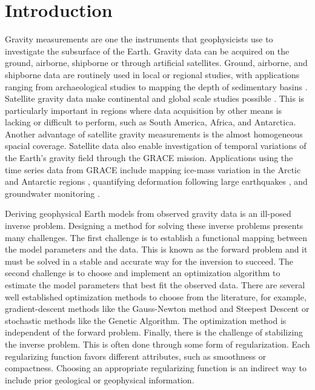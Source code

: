 \chapter{Introduction}


Gravity measurements are one the instruments that geophysicists use to
investigate the subsurface of the Earth.
Gravity data can be acquired on the ground, airborne, shipborne or through
artificial satellites.
Ground, airborne, and shipborne data are routinely used in local or regional
studies, with applications ranging from archaeological studies
\citep[e.g., ][]{panisova2013} to mapping the depth of
sedimentary basins \citep[e.g., ][]{gordon2013}.
Satellite gravity data make continental and global scale studies possible
\citep[e.g., ][]{vandermeijde2013, vandermeijde2015, bouman2013,
braitenberg2015, reguzzoni2013}.
This is particularly important in regions where data acquisition by other means
is lacking or difficult to perform, such as South America, Africa, and
Antarctica.
Another advantage of satellite gravity measurements is the almost homogeneous
spacial coverage.
Satellite data also enable investigation of temporal variations of the Earth's
gravity field through the GRACE mission.
Applications using the time series data from GRACE include mapping ice-mass
variation in the Arctic \citep{chen2011} and Antarctic regions
\citep{ramillien2006}, quantifying deformation following large earthquakes
\citep{mikhailov2014}, and groundwater monitoring \citep{humphrey2016}.

Deriving geophysical Earth models from observed gravity data is an ill-posed
inverse problem.
Designing a method for solving these inverse problems presents many challenges.
The first challenge is to establish a functional mapping between the model
parameters and the data.
This is known as the forward problem and it must be solved in a stable and
accurate way for the inversion to succeed.
The second challenge is to choose and implement an optimization algorithm to
estimate the model parameters that best fit the observed data.
There are several well established optimization methods to choose from the
literature, for example, gradient-descent methods like the Gauss-Newton method
and Steepest Descent or stochastic  methods like the Genetic Algorithm.
The optimization method is independent of the forward problem.
Finally, there is the challenge of stabilizing the inverse problem.
This is often done through some form of regularization.
Each regularizing function favors different attributes, such as smoothness or
compactness.
Choosing an appropriate regularizing function is an indirect way to include
prior geological or geophysical information.

